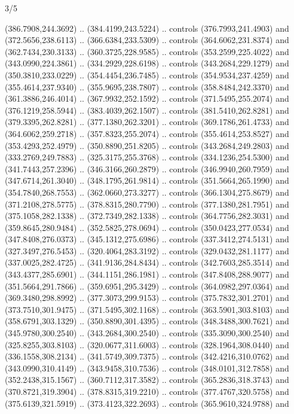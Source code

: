 \begin{flagdescription}{3/5}
\begin{scope}[xshift=0.5\flaglength]
\begin{scope}[scale=0.00167\flagwidth,yshift=210.9mm,xshift=-175.8mm]
\begin{scope}[y=-1pt, x=1pt]
  (386.7908,244.3692) .. (384.4199,243.5224) .. controls (376.7993,241.4903) and
  (372.5656,238.6113) .. (366.6384,233.5309) .. controls (364.6062,231.8374) and
  (362.7434,230.3133) .. (360.3725,228.9585) .. controls (353.2599,225.4022) and
  (343.0990,224.3861) .. (334.2929,228.6198) .. controls (343.2684,229.1279) and
  (350.3810,233.0229) .. (354.4454,236.7485) .. controls (354.9534,237.4259) and
  (355.4614,237.9340) .. (355.9695,238.7807) .. controls (358.8484,242.3370) and
  (361.3886,246.4014) .. (367.9932,252.1592) .. controls (371.5495,255.2074) and
  (376.1219,258.5944) .. (383.4039,262.1507) .. controls (381.5410,262.8281) and
  (379.3395,262.8281) .. (377.1380,262.3201) .. controls (369.1786,261.4733) and
  (364.6062,259.2718) .. (357.8323,255.2074) .. controls (355.4614,253.8527) and
  (353.4293,252.4979) .. (350.8890,251.8205) .. controls (343.2684,249.2803) and
  (333.2769,249.7883) .. (325.3175,255.3768) .. controls (334.1236,254.5300) and
  (341.7443,257.2396) .. (346.3166,260.2879) .. controls (346.9940,260.7959) and
  (347.6714,261.3040) .. (348.1795,261.9814) .. controls (351.5664,265.1990) and
  (354.7840,268.7553) .. (362.0660,273.3277) .. controls (366.1304,275.8679) and
  (371.2108,278.5775) .. (378.8315,280.7790) .. controls (377.1380,281.7951) and
  (375.1058,282.1338) .. (372.7349,282.1338) .. controls (364.7756,282.3031) and
  (359.8645,280.9484) .. (352.5825,278.0694) .. controls (350.0423,277.0534) and
  (347.8408,276.0373) .. (345.1312,275.6986) .. controls (337.3412,274.5131) and
  (327.3497,276.5453) .. (320.4064,283.3192) .. controls (329.0432,281.1177) and
  (337.0025,282.4725) .. (341.9136,284.8434) .. controls (342.7603,285.3514) and
  (343.4377,285.6901) .. (344.1151,286.1981) .. controls (347.8408,288.9077) and
  (351.5664,291.7866) .. (359.6951,295.3429) .. controls (364.0982,297.0364) and
  (369.3480,298.8992) .. (377.3073,299.9153) .. controls (375.7832,301.2701) and
  (373.7510,301.9475) .. (371.5495,302.1168) .. controls (363.5901,303.8103) and
  (358.6791,303.1329) .. (350.8890,301.4395) .. controls (348.3488,300.7621) and
  (345.9780,300.2540) .. (343.2684,300.2540) .. controls (335.3090,300.2540) and
  (325.8255,303.8103) .. (320.0677,311.6003) .. controls (328.1964,308.0440) and
  (336.1558,308.2134) .. (341.5749,309.7375) .. controls (342.4216,310.0762) and
  (343.0990,310.4149) .. (343.9458,310.7536) .. controls (348.0101,312.7858) and
  (352.2438,315.1567) .. (360.7112,317.3582) .. controls (365.2836,318.3743) and
  (370.8721,319.3904) .. (378.8315,319.2210) .. controls (377.4767,320.5758) and
  (375.6139,321.5919) .. (373.4123,322.2693) .. controls (365.9610,324.9788) and

\end{scope}
\end{scope}
\end{scope}
\end{flagdescription}
